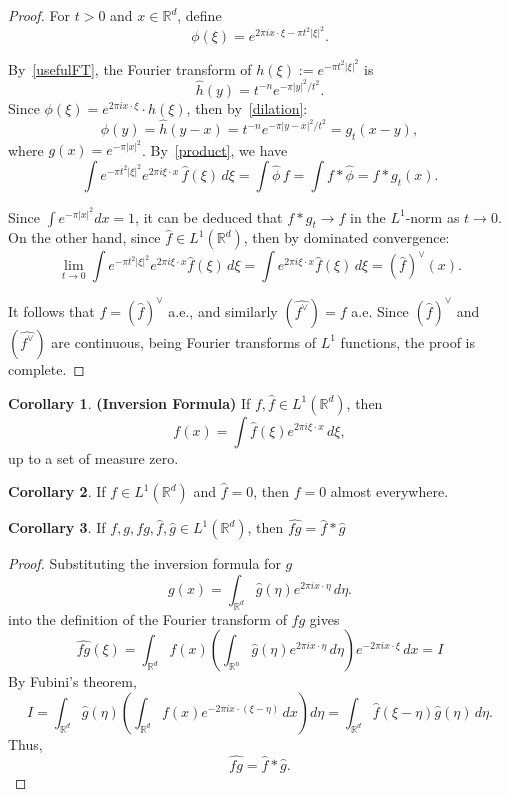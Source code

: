 \documentclass[12pt,a4paper]{report}
\theoremstyle{definition}
\newtheorem{corollary}{Corollary}
\begin{document}
\begin{proof}
For \( t > 0 \) and \( x \in \mathbb{R}^d \), define
\[
\phi(\xi) = e^{2\pi i x \cdot \xi - \pi t^2 |\xi|^2}.
\]

By~\ref{usefulFT}, the Fourier transform of \( h(\xi) := e^{-\pi t^2 |\xi|^2} \) is
\[
\widehat{h}(y) = t^{-n} e^{-\pi |y|^2 / t^2}.
\]
Since \( \phi(\xi) = e^{2\pi i x \cdot \xi} \cdot h(\xi) \), then by~\ref{dilation}:
\[
\widehat{\phi}(y) = \widehat{h}(y - x) = t^{-n} e^{-\pi |y - x|^2 / t^2} = g_t(x - y),
\]
where \( g(x) = e^{-\pi |x|^2} \). By~\ref{product}, we have
\[
\int e^{-\pi t^2 |\xi|^2} e^{2\pi i \xi \cdot x} \, \widehat{f}(\xi) \, d\xi = \int \widehat{\phi} \, f = \int f * \widehat{\phi} = f * g_t(x).
\]

Since \( \int e^{-\pi |x|^2} dx = 1 \), it can be deduced that \( f * g_t \to f \) in the \( L^1 \)-norm as \( t \to 0 \). On the other hand, since \( \widehat{f} \in L^1(\mathbb{R}^d) \), then by dominated convergence:
\[
\lim_{t \to 0} \int e^{-\pi t^2 |\xi|^2} e^{2\pi i \xi \cdot x} \widehat{f}(\xi) \, d\xi = \int e^{2\pi i \xi \cdot x} \widehat{f}(\xi) \, d\xi = (\widehat{f})^\vee(x).
\]

It follows that \( f = (\widehat{f})^\vee \) a.e., and similarly \( (\widehat{f^\vee}) = f \) a.e. Since \( (\widehat{f})^\vee \) and \( (\widehat{f^\vee}) \) are continuous, being Fourier transforms of \( L^1 \) functions, the proof is complete.

\end{proof}

\begin{corollary} \label{eq:inversion} {\textbf{(Inversion Formula)}}
If \( f, \widehat{f} \in L^1(\mathbb{R}^d) \), then
$$
f(x) = \int \widehat{f}(\xi) e^{2\pi i \xi \cdot x} \, d\xi,
$$
up to a set of measure zero.
\end{corollary}

\begin{corollary}
    If $f \in L^1(\mathbb{R}^d)$ and $\widehat{f} = 0$, then $f = 0$ almost everywhere.
\end{corollary}

\begin{corollary} \label{eqn3.10}
If $f, g, fg, \widehat{f}, \widehat{g} \in L^1(\mathbb{R}^d)$, then $\widehat{fg} = \widehat{f} * \widehat{g}$
\end{corollary}

\begin{proof}
Substituting the inversion formula for \( g \)
\[
g(x) = \int_{\mathbb{R}^d} \widehat{g}(\eta) e^{2\pi i x \cdot \eta} \, d\eta.
\]
into the definition of the Fourier transform  of $fg$ gives
\[
\widehat{fg}(\xi)
= \int_{\mathbb{R}^d} f(x) \left( \int_{\mathbb{R}^n} \widehat{g}(\eta) e^{2\pi i x \cdot \eta} \, d\eta \right) e^{-2\pi i x \cdot \xi} \, dx = I
\]
By Fubini's theorem,
\[
I = \int_{\mathbb{R}^d} \widehat{g}(\eta) \left( \int_{\mathbb{R}^d} f(x) e^{-2\pi i x \cdot (\xi - \eta)} \, dx \right) d\eta
= \int_{\mathbb{R}^d} \widehat{f}(\xi - \eta) \widehat{g}(\eta) \, d\eta.
\]
Thus,
\[
\widehat{fg} = \widehat{f} * \widehat{g}.
\]
\end{proof}
\end{document}
